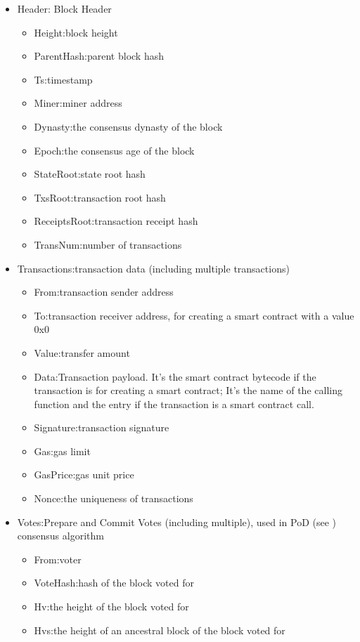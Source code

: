 \begin{itemize}
	\item Header: Block Header
		\begin{itemize}
		\item Height:block height
		\item ParentHash:parent block hash
		\item Ts:timestamp
		\item Miner:miner address
		\item Dynasty:the consensus dynasty of the block
		\item Epoch:the consensus age of the block
		\item StateRoot:state root hash
		\item TxsRoot:transaction root hash
		\item ReceiptsRoot:transaction receipt hash
		\item TransNum:number of transactions
		\end{itemize}
	\item Transactions:transaction data (including multiple transactions)
		\begin{itemize}
		\item From:transaction sender address
		\item To:transaction receiver address, for creating a smart contract with a value 0x0
		\item Value:transfer amount
		\item Data:Transaction payload. It's the smart contract bytecode if the transaction is for creating a smart contract; It's the name of the calling function and the entry if the transaction is a smart contract call.
		\item Signature:transaction signature
		\item Gas:gas limit
		\item GasPrice:gas unit price
		\item Nonce:the uniqueness of transactions
		\end{itemize}
	\item Votes:Prepare and Commit Votes (including multiple), used in PoD (see ) consensus algorithm
		\begin{itemize}
		\item From:voter
		\item VoteHash:hash of the block voted for
		\item Hv:the height of the block voted for
		\item Hvs:the height of an ancestral block of the block voted for

\end{itemize}
\end{itemize}
